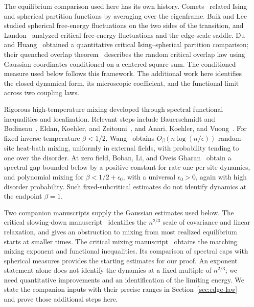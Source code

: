 The equilibrium comparison used here has its own history.
Comets~\cite{Comets1996} related Ising and spherical partition functions by
averaging over the eigenframe. Baik and Lee~\cite{BaikLee2016} studied
spherical free-energy fluctuations on the two sides of the transition,
and Landon~\cite{Landon2022} analyzed critical free-energy fluctuations and
the edge-scale saddle. Du and Huang~\cite{DuHuang2026FreeEnergy} obtained
a quantitative critical Ising--spherical partition comparison; their
quenched overlap theorem~\cite{DuHuang2026Overlap} describes the random
critical overlap law using Gaussian coordinates conditioned on a
centered square sum. The conditioned measure used below follows this framework.
The additional work here identifies the closed dynamical form, its
microscopic coefficient, and the functional limit across two coupling laws.

Rigorous high-temperature mixing developed through spectral functional
inequalities and localization. Relevant steps include
Bauerschmidt and Bodineau~\cite{BauerschmidtBodineau2019},
Eldan, Koehler, and Zeitouni~\cite{EldanKoehlerZeitouni2022}, and
Anari, Koehler, and Vuong~\cite{AnariKoehlerVuong2024}.
For fixed inverse temperature $\beta<1/2$, Wang~\cite{Wang2026} obtains
$O_\beta(n\log(n/\epsilon))$ random-site heat-bath mixing, uniformly in
external fields, with probability tending to one over the disorder.
At zero field, Boban, Li, and Oveis
Gharan~\cite{BobanLiOveisGharan2026} obtain a spectral gap bounded below by
a positive constant for rate-one-per-site dynamics, and polynomial mixing
for $\beta<1/2+\epsilon_0$, with a universal
$\epsilon_0>0$, again with high disorder probability.
Such fixed-subcritical estimates do not identify dynamics
at the endpoint $\beta=1$.

Two companion manuscripts supply the Gaussian estimates used below.
The critical slowing-down manuscript~\cite[Theorems~1.1 and~1.2]{CS} identifies the $n^{2/3}$
scale of covariance and linear relaxation, and gives an obstruction to
mixing from most realized equilibrium starts at smaller times. The critical
mixing manuscript~\cite[Theorem~1.1]{CM} obtains the matching mixing exponent and
functional inequalities. Its comparison of spectral caps with spherical
measures provides the starting estimates for our proof. An exponent statement
alone does not identify the dynamics at a fixed multiple of $n^{2/3}$;
we need quantitative improvements and an identification of the limiting
energy. We state the companion inputs with their precise ranges in
Section~\ref{sec:edge-law} and prove those additional steps here.

